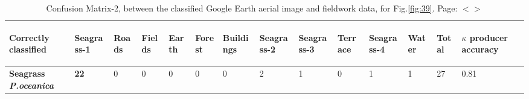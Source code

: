 \documentclass[11pt]{article}
\begin{document}
\begin{appendices}
\begin{table}[H]\footnotesize\label{page-liii}\label{tab:matrix-2}
	\caption{Confusion Matrix-2, between the classified Google Earth aerial image and fieldwork data, for Fig.\ref{fig:39}. Page: $<$\pageref{page-50acc}$>$}\label{tab:kappa-2}
	\centering
	 \begin{tabular}{| p{1.7cm} | p{0.7cm}| p{0.7cm}|p{0.7cm}|p{0.7cm}|p{0.7cm}|p{0.7cm}|p{0.7cm}|p{0.7cm}|p{0.7cm}|p{0.7cm}|p{0.7cm}|| p{0.7cm}||p{0.7cm}|}
	    \hline
		     \begin{sideways}\textbf{Correctly classified}\end{sideways} & \begin{sideways}\textbf{Seagrass-1}\end{sideways} &  \begin{sideways}\textbf{Roads}\end{sideways} &  \begin{sideways}\textbf{Fields}\end{sideways} &  \begin{sideways}\textbf{Earth}\end{sideways} &  \begin{sideways}\textbf{Forest}\end{sideways} &  \begin{sideways}\textbf{Buildings}\end{sideways} &  \begin{sideways}\textbf{Seagrass-2}\end{sideways} & \begin{sideways}\textbf{Seagrass-3}\end{sideways} &  \begin{sideways}\textbf{Terrace}\end{sideways} & \begin{sideways}\textbf{Seagrass-4}\end{sideways} &  \begin{sideways}\textbf{Water}\end{sideways} & \cellcolor{LightBlue}\begin{sideways}\textbf{Total}\end{sideways} & \begin{sideways}\textbf{$\kappa$ producer accuracy}\end{sideways} \\ \hline \hline
		\textbf{Seagrass \textit{P.oceanica}}& \cellcolor{LightSkyBlue}\textbf{22} & 0 & 0 & 0 & 0 & 0 & 2 & 1 & 0 & 1 & 1 & \cellcolor{LightBlue}27 & 0.81 \\ \hline

\end{tabular}
\end{table}
\end{appendices}
\end{document}
